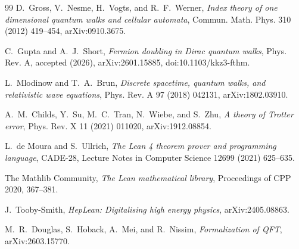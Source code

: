 \documentclass[11pt]{article}
\begin{document}
\begin{thebibliography}{99}
D.~Gross, V.~Nesme, H.~Vogts, and R.~F.~Werner,
\emph{Index theory of one dimensional quantum walks and cellular automata},
Commun. Math. Phys. 310 (2012) 419--454, arXiv:0910.3675.

C.~Gupta and A.~J.~Short,
\emph{Fermion doubling in Dirac quantum walks},
Phys. Rev. A, accepted (2026), arXiv:2601.15885,
doi:10.1103/kkz3-fthm.

L.~Mlodinow and T.~A.~Brun,
\emph{Discrete spacetime, quantum walks, and relativistic wave equations},
Phys. Rev. A 97 (2018) 042131, arXiv:1802.03910.

A.~M.~Childs, Y.~Su, M.~C.~Tran, N.~Wiebe, and S.~Zhu,
\emph{A theory of Trotter error}, Phys. Rev. X 11 (2021) 011020,
arXiv:1912.08854.

L.~de Moura and S.~Ullrich,
\emph{The Lean 4 theorem prover and programming language},
CADE-28, Lecture Notes in Computer Science 12699 (2021) 625--635.

The Mathlib Community,
\emph{The Lean mathematical library}, Proceedings of CPP 2020, 367--381.

J.~Tooby-Smith,
\emph{HepLean: Digitalising high energy physics}, arXiv:2405.08863.

M.~R.~Douglas, S.~Hoback, A.~Mei, and R.~Nissim,
\emph{Formalization of QFT}, arXiv:2603.15770.

\end{thebibliography}
\end{document}
